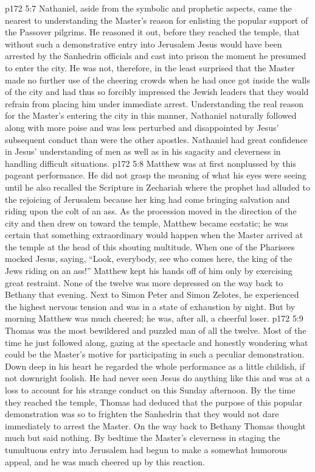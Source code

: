 \vs p172 5:7 \pc Nathaniel, aside from the symbolic and prophetic aspects, came the nearest to understanding the Master’s reason for enlisting the popular support of the Passover pilgrims. He reasoned it out, before they reached the temple, that without such a demonstrative entry into Jerusalem Jesus would have been arrested by the Sanhedrin officials and cast into prison the moment he presumed to enter the city. He was not, therefore, in the least surprised that the Master made no further use of the cheering crowds when he had once got inside the walls of the city and had thus so forcibly impressed the Jewish leaders that they would refrain from placing him under immediate arrest. Understanding the real reason for the Master’s entering the city in this manner, Nathaniel naturally followed along with more poise and was less perturbed and disappointed by Jesus’ subsequent conduct than were the other apostles. Nathaniel had great confidence in Jesus’ understanding of men as well as in his sagacity and cleverness in handling difficult situations.
\vs p172 5:8 \pc Matthew was at first nonplussed by this pageant performance. He did not grasp the meaning of what his eyes were seeing until he also recalled the Scripture in Zechariah where the prophet had alluded to the rejoicing of Jerusalem because her king had come bringing salvation and riding upon the colt of an ass. As the procession moved in the direction of the city and then drew on toward the temple, Matthew became ecstatic; he was certain that something extraordinary would happen when the Master arrived at the temple at the head of this shouting multitude. When one of the Pharisees mocked Jesus, saying, “Look, everybody, see who comes here, the king of the Jews riding on an ass!” Matthew kept his hands off of him only by exercising great restraint. None of the twelve was more depressed on the way back to Bethany that evening. Next to Simon Peter and Simon Zelotes, he experienced the highest nervous tension and was in a state of exhaustion by night. But by morning Matthew was much cheered; he was, after all, a cheerful loser.
\vs p172 5:9 \pc Thomas was the most bewildered and puzzled man of all the twelve. Most of the time he just followed along, gazing at the spectacle and honestly wondering what could be the Master’s motive for participating in such a peculiar demonstration. Down deep in his heart he regarded the whole performance as a little childish, if not downright foolish. He had never seen Jesus do anything like this and was at a loss to account for his strange conduct on this Sunday afternoon. By the time they reached the temple, Thomas had deduced that the purpose of this popular demonstration was so to frighten the Sanhedrin that they would not dare immediately to arrest the Master. On the way back to Bethany Thomas thought much but said nothing. By bedtime the Master’s cleverness in staging the tumultuous entry into Jerusalem had begun to make a somewhat humorous appeal, and he was much cheered up by this reaction.
